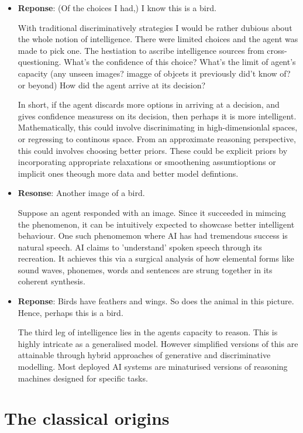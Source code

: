 \documentclass[twoside]{article}
\begin{document}
\begin{itemize}
  \item \textbf{Reponse}: (Of the choices I had,) I know this is a bird.

With traditional discriminatively strategies I would be rather dubious about the whole notion of intelligence. There were limited choices and the agent was made to pick one. The hestiation to ascribe intelligence sources from cross-questioning. What's the confidence of this choice? What's the limit of agent's capacity (any unseen images? imagge of objcets it previously did't know of? or beyond) How did the agent arrive at its decision?

In short, if the agent discards more options in arriving at a decision, and gives confidence measuress on its decision, then perhaps it is more intelligent. Mathematically, this could involve discrinimating in high-dimensionlal spaces, or regressing to continous space. From an approximate reasoning perspective, this could involves choosing better priors. These could be explicit priors by incorporating appropriate relaxations or smoothening assumtioptions or implicit ones theough more data and better model defintions. 

  \item \textbf{Resonse}: Another image of a bird. 

Suppose an agent responded with an image. Since it succeeded in mimcing the phenomenon, it can be intuitively expected to showcase better intelligent behaviour. One such phenomemon where AI has had tremendous success is natural speech. AI claims to 'understand' spoken speech through its recreation. It achieves this via a surgical analysis of how elemental forms like sound waves, phonemes, words and sentences are strung together in its coherent synthesis.

  \item \textbf{Reponse}: Birds have feathers and wings. So does the animal in this picture. Hence, perhaps this is a bird.

The third leg of intelligence lies in the agents capacity to reason. This is highly intricate as a generalised model. However simplified versions of this are attainable through hybrid approaches of generative and discriminative modelling. Most deployed AI systems are minaturised versions of reasoning machines designed for specific tasks.

\end{itemize}


\section{The classical origins} %
\label{sec:the_classical_begininngs}
\end{document}
